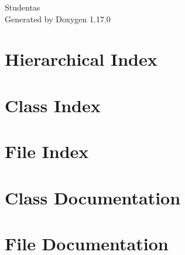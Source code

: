 \documentclass[twoside]{book}
\newcommand{\+}{\discretionary{\mbox{\scriptsize$\hookleftarrow$}}{}{}}
\newcommand{\clearemptydoublepage}{%
    \newpage{\pagestyle{empty}\cleardoublepage}%
  }
\begin{document}
  \raggedbottom
    \hypersetup{pageanchor=false,
                bookmarksnumbered=true,
                pdfencoding=unicode
               }
  \begin{titlepage}
  \vspace*{7cm}
  \begin{center}%
  {\Large Studentas}\\
  \vspace*{1cm}
  {\large Generated by Doxygen 1.17.0}\\
  \end{center}
  \end{titlepage}
  \clearemptydoublepage
  \tableofcontents
  \clearemptydoublepage
  \hypersetup{pageanchor=true}
\chapter{Hierarchical Index}

\chapter{Class Index}

\chapter{File Index}

\chapter{Class Documentation}


\chapter{File Documentation}









  \backmatter
  \newpage
  \clearemptydoublepage
  \printindex
\end{document}

